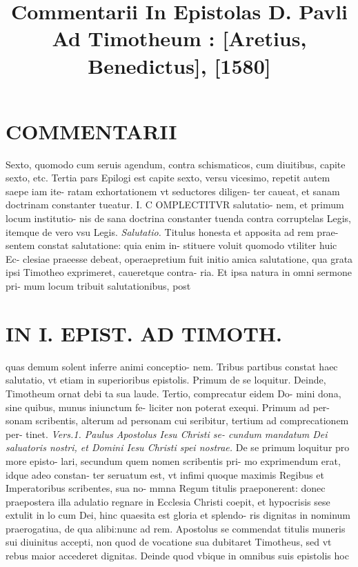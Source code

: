 \documentclass{article}
\begin{document}
\date{}
        \title{Commentarii In Epistolas D. Pavli Ad Timotheum : [Aretius, Benedictus], [1580]}
\maketitle

\begin{pages} 
\beginnumbering
        
\section*{COMMENTARII }
\marginpar{[ p.8 ]}\pstart Sexto, quomodo cum seruis agendum, contra schismaticos, cum diuitibus, capite sexto, etc.  \pend\pstart Tertia pars Epilogi est capite sexto, versu vicesimo, repetit autem saepe iam ite- ratam exhortationem vt seductores diligen- ter caueat, et sanam doctrinam constanter tueatur.  \pendCAPVT I. \pstart C OMPLECTITVR salutatio- nem, et primum locum institutio- nis de sana doctrina constanter tuenda contra corruptelas Legis, itemque de vero vsu Legis.  \pend
\textit{Salutatio. }\pstart Titulus honesta et apposita ad rem prae- sentem constat salutatione: quia enim in- stituere voluit quomodo vtiliter huic Ec- clesiae praeesse debeat, operaepretium fuit initio amica salutatione, qua grata ipsi Timotheo exprimeret, caueretque contra- ria. Et ipsa natura in omni sermone pri- mum locum tribuit salutationibus, post  \pend
\textbf{}
\section*{IN I. EPIST. AD TIMOTH. }
\marginpar{[ p.9 ]}\pstart quas demum solent inferre animi conceptio- nem.  \pend\pstart Tribus partibus constat haec salutatio, vt etiam in superioribus epistolis. Primum de se loquitur. Deinde, Timotheum ornat debi ta sua laude. Tertio, comprecatur eidem Do- mini dona, sine quibus, munus iniunctum fe- liciter non poterat exequi. Primum ad per- sonam scribentis, alterum ad personam cui seribitur, tertium ad comprecationem per- tinet.  \pend
\textit{Vers.1. Paulus Apostolus Iesu Christi se- cundum mandatum Dei saluatoris nostri, et Domini Iesu Christi spei nostrae. }\pstart De se primum loquitur pro more episto- lari, secundum quem nomen scribentis pri- mo exprimendum erat, idque adeo constan- ter seruatum est, vt infimi quoque maximis Regibus et Imperatoribus scribentes, sua no- mmna Regum titulis praeponerent: donec praepostera illa adulatio regnare in Ecclesia Christi coepit, et hypocrisis sese extulit in lo cum Dei, hinc quaesita est gloria et splendo- ris dignitas in nominum praerogatiua, de qua alibi:nunc ad rem. Apostolus se commendat titulis muneris sui diuinitus accepti, non quod de vocatione sua dubitaret Timotheus, sed vt rebus maior accederet dignitas. Deinde quod vbique in omnibus suis epistolis hoc  \pend

\end{pages}
\end{document}
